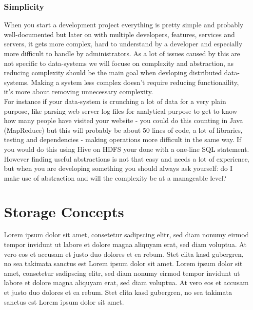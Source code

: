 \subsubsection{Simplicity}
\label{tf_nfreq_maintainability_simplicity}
When you start a development project everything is pretty simple and probably well-documented but later on with multiple developers, features, services and servers, it gets more complex, hard to understand by a developer and especially more difficult to handle by administrators. As a lot of issues caused by this are not specific to data-systems we will focuse on complexity and abstraction, as reducing complexity should be the main goal when devloping distributed data-systems. Making a system less complex doesn't require reducing functionaility, it's more about removing unnecessary complexity.\\
For instance if your data-system is crunching a lot of data for a very plain purpose, like parsing web server log files for analytical purpose to get to know how many people have visited your website - you could do this counting in Java (MapReduce) but this will probably be about 50 lines of code, a lot of libraries, testing and dependencies - making operations more difficult in the same way. If you would do this using Hive on HDFS your done with a one-line SQL statement.\\

However finding useful abstractions is not that easy and needs a lot of experience, but when you are developing something you should always ask yourself: do I make use of abstraction and will the complexity be at a manageable level?


\newpage
\section{Storage Concepts}
\label{tf_storageconcepts}
Lorem ipsum dolor sit amet, consetetur sadipscing elitr, sed diam nonumy eirmod tempor invidunt ut labore et dolore magna aliquyam erat, sed diam voluptua. At vero eos et accusam et justo duo dolores et ea rebum. Stet clita kasd gubergren, no sea takimata sanctus est Lorem ipsum dolor sit amet. Lorem ipsum dolor sit amet, consetetur sadipscing elitr, sed diam nonumy eirmod tempor invidunt ut labore et dolore magna aliquyam erat, sed diam voluptua. At vero eos et accusam et justo duo dolores et ea rebum. Stet clita kasd gubergren, no sea takimata sanctus est Lorem ipsum dolor sit amet.

\newpage

